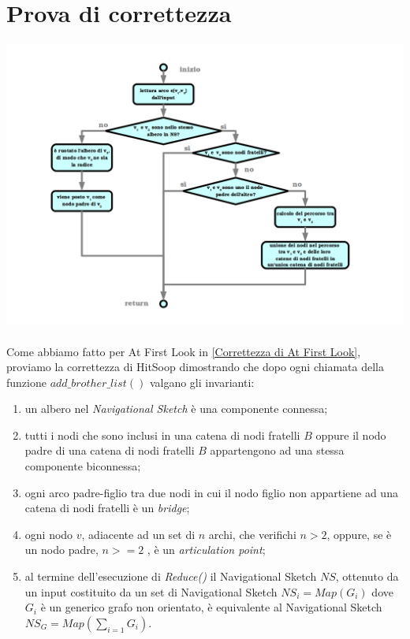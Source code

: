 \documentclass[a4paper,11pt]{report}
\begin{document}
\section{Prova di correttezza}\label{Prova di correttezza}
\paragraph{}
\centerline{\includegraphics[width=150mm]{images/flusso_HitSoop.png}} 
\paragraph{}
Come abbiamo fatto per At First Look in \ref{Correttezza di At First Look}, proviamo la correttezza di HitSoop dimostrando che dopo ogni
chiamata della funzione $add\_brother\_list()$
valgano gli invarianti:
\begin{enumerate}
 \item un albero nel \emph{Navigational Sketch} è una componente connessa;
 \item tutti i nodi che sono inclusi in una catena di nodi fratelli $B$ oppure il nodo padre di una catena di nodi fratelli $B$ appartengono
ad una stessa componente biconnessa;
 \item ogni arco padre-figlio tra due nodi in cui il nodo figlio non appartiene ad una catena di nodi fratelli è un \emph{bridge};
 \item ogni nodo $v$, adiacente ad un set di $n$ archi, che verifichi $n>2$, oppure, se è un nodo padre, $n>=2$ , è un \emph{articulation
point};
 \item al termine dell'esecuzione di \emph{Reduce()} il Navigational Sketch $NS$, ottenuto da un input costituito da un set di Navigational
Sketch $NS_i=Map\left(G_i\right)$ dove $G_i$ è un generico grafo
non orientato, è equivalente al Navigational Sketch $NS_G=Map\left(\sum_{i=1}G_i\right)$.  
\end{enumerate}
\end{document}
